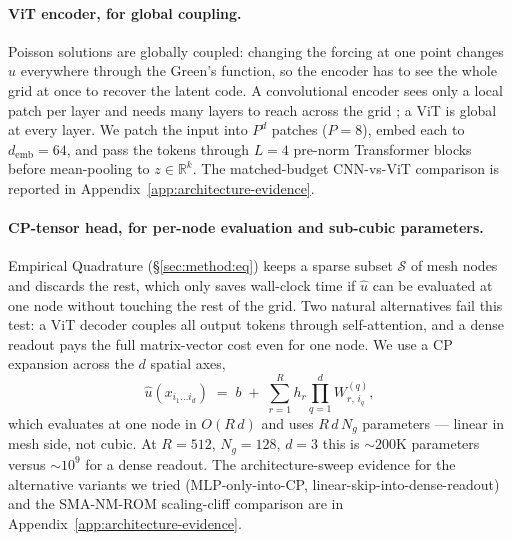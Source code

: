 \documentclass{article}
\begin{document}
\paragraph{ViT encoder, for global coupling.}
Poisson solutions are globally coupled: changing the forcing at one
point changes $u$ everywhere through the Green's function, so the
encoder has to see the whole grid at once to recover the latent code.
A convolutional encoder sees only a local patch per layer and needs
many layers to reach across the grid \citep{Luo2016ERF}; a ViT
\citep{Dosovitskiy2021ViT,Vaswani2017Attention} is global at every
layer. We patch the input into $P^d$ patches ($P = 8$), embed each to
$d_\mathrm{emb} = 64$, and pass the tokens through $L = 4$ pre-norm
\citep{Xiong2020PreNorm} Transformer blocks before mean-pooling to
$z \in \mathbb{R}^k$. The
matched-budget CNN-vs-ViT comparison is reported in
Appendix~\ref{app:architecture-evidence}.

\paragraph{CP-tensor head, for per-node evaluation and sub-cubic
parameters.} Empirical Quadrature (\S\ref{sec:method:eq}) keeps a
sparse subset $\mathcal{S}$ of mesh nodes and discards the rest, which
only saves wall-clock time if $\hat u$ can be evaluated at one node
without touching the rest of the grid. Two natural alternatives fail
this test: a ViT decoder couples all output tokens through
self-attention, and a dense readout pays the full matrix-vector cost
even for one node. We use a CP expansion across the $d$ spatial axes,
\begin{equation}
  \hat u(x_{i_1 \ldots i_d})
  \;=\; b \;+\; \sum_{r=1}^{R} h_r \prod_{q=1}^{d} W^{(q)}_{r,\, i_q},
  \label{eq:cp}
\end{equation}
which evaluates at one node in $O(R\, d)$ and uses $R\, d\, N_g$
parameters --- linear in mesh side, not cubic. At $R = 512$,
$N_g = 128$, $d = 3$ this is $\sim$$200$K parameters versus
$\sim$$10^9$ for a dense readout. The architecture-sweep evidence for
the alternative variants we tried (MLP-only-into-CP,
linear-skip-into-dense-readout) and the SMA-NM-ROM scaling-cliff
comparison are in Appendix~\ref{app:architecture-evidence}.
\end{document}
